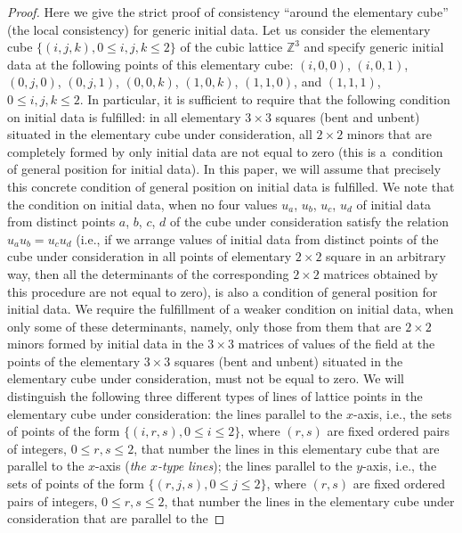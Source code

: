 \documentclass[pdftex]{sigma}
\begin{document}
\begin{proof}
 Here we give the strict proof of consistency
``around the elementary cube'' (the local consistency) for generic initial data.
Let us consider the elementary cube $\{(i, j, k), 0
\leq i, j, k \leq 2 \}$ of the cubic lattice $\mathbb{Z}^3$ and
specify generic initial data at the following points of this
elementary cube: $(i, 0, 0)$, $(i, 0, 1)$, $(0, j, 0)$, $(0, j, 1)$,
$(0, 0, k)$, $(1, 0, k)$, $(1, 1, 0)$, and $(1, 1, 1)$, $0 \leq i,
j, k \leq 2$. In particular, it is suf\/f\/icient to require that the
following condition on initial data is fulf\/illed: in all elementary
$3 \times 3$ squares (bent and unbent) situated in the elementary
cube under consideration, all $2 \times 2$ minors that are
completely formed by only initial data are not equal to zero (this
is a~condition of general position for initial data). In this paper,
we will assume that precisely this concrete condition of general
position on initial data is fulf\/illed. We note that the condition on
initial data, when no four values $u_a$, $u_b$, $u_c$, $u_d$ of initial
data from distinct points $a$, $b$, $c$, $d$ of the cube under
consideration satisfy the relation $u_a u_b = u_c u_d$ (i.e., if we
arrange values of initial data from distinct points of the cube
under consideration in all points of elementary $2 \times 2$ square
in an arbitrary way, then all the determinants of the corresponding
$2 \times 2$ matrices obtained by this procedure are not equal to
zero), is also a condition of general position for initial data. We
require the fulf\/illment of a weaker condition on initial data, when
only some of these determinants, namely, only those from them that
are $2 \times 2$ minors formed by initial data in the $3 \times 3$
matrices of values of the f\/ield at the points of the elementary $3
\times 3$ squares (bent and unbent) situated in the elementary cube
under consideration, must not be equal to zero. We will distinguish
the following three dif\/ferent types of lines of lattice points in
the elementary cube under consideration: the lines parallel to the
$x$-axis, i.e., the sets of points of the form $\{(i, r, s), 0 \leq
i \leq 2\}$, where $(r, s)$ are f\/ixed ordered pairs of integers, $0
\leq r, s \leq 2$, that number the lines in this elementary cube
that are parallel to the $x$-axis ({\it the $x$-type lines}); the
lines parallel to the $y$-axis, i.e., the sets of points of the form
$\{(r, j, s), 0 \leq j \leq 2\}$, where $(r, s)$ are f\/ixed ordered
pairs of integers, $0 \leq r, s \leq 2$, that number the lines in
the elementary cube under consideration that are parallel to the

\end{proof}
\end{document}
